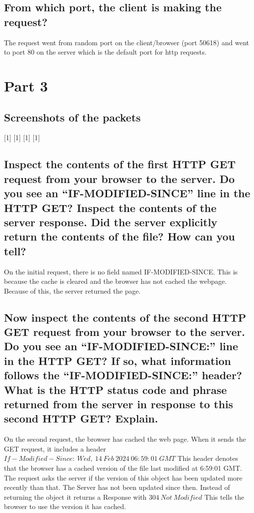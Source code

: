 \documentclass{assignment-x}
\begin{document}
\subsection{From which port, the client is making the request?}
The request went from random port on the client/browser (port 50618) and went to port 80 on the server which is the default port for http requests.

\section{Part 3}
\subsection{Screenshots of the packets}
[1\linewidth]
[1\linewidth]
[1\linewidth]
[1\linewidth]


\subsection{Inspect the contents of the first HTTP GET request from your browser to the server. Do you see an “IF-MODIFIED-SINCE” line in the HTTP GET? Inspect the contents of the server response. Did the server explicitly return the contents of the file? How can you tell?}
On the initial request, there is no field named IF-MODIFIED-SINCE. This is because the cache is cleared and the browser has not cached the webpage. Because of this, the server returned the page.
\subsection{Now inspect the contents of the second HTTP GET request from your browser to the server. Do you see an “IF-MODIFIED-SINCE:” line in the HTTP GET? If so, what information follows the “IF-MODIFIED-SINCE:” header? What is the HTTP status code and phrase returned from the server in response to this second HTTP GET? Explain.}
On the second request, the browser has cached the web page. When it sends the GET request, it includes a header $If-Modified-Since:\ Wed,\ 14\ Feb\ 2024\ 06:59:01\ GMT$ This header denotes that the browser has a cached version of the file last modified at 6:59:01 GMT. The request asks the server if the version of this object has been updated more recently than that. The Server has not been updated since then. Instead of returning the object it returns a Response with $304\ Not\ Modified$ This tells the browser to use the version it has cached.
\end{document}
